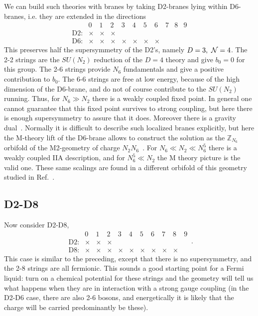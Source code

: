 \documentclass[12pt]{article}
\begin{document}
{We can build such theories with branes by taking D2-branes lying within D6-branes, i.e. they are extended in the directions
\begin{equation}
\begin{array}{ccccccccccc}
&0&1&2&3&4&5&6&7&8&9 \\
\mbox{D2:}&\times&\times&\times&&&&&&& \\
\mbox{D6:}&\times&\times&\times&\times&\times&\times&\times&&&
\end{array} 
\end{equation}
This preserves half the supersymmetry of the D2's, namely $D=3,\ {\cal N} = 4$.  The 2-2 strings are the $SU(N_2)$ reduction of the $D=4$ theory and give $b_0 = 0$ for this group.  The 2-6 strings provide $N_6$ fundamentals and give a positive contribution to $b_0$.  The 6-6 strings are free at low energy, because of the high dimension of the D6-brane, and do not of course contribute to the $SU(N_2)$ running.  Thus, for $N_6 \gg N_2$ there is a weakly coupled fixed point.  In general one cannot guarantee that this fixed point survives to strong coupling, but here there is enough supersymmetry to assure that it does.  Moreover there is a gravity dual~\cite{Pelc:1999ms}.  Normally it is difficult to describe such localized branes explicitly, but here the M-theory lift of the D6-brane allows to construct the solution as the ${\mathbb Z}_{N_6}$ orbifold of the M2-geometry of charge $N_2 N_6$~\cite{Itzhaki:1998uz}.  For $N_6 \ll N_2 \ll N_6^5$ there is a weakly coupled IIA description, and for $N_6^5 \ll N_2$ the M theory picture is the valid one.  These same scalings are found in a different orbifold of this geometry studied in Ref.~\cite{Aharony:2008ug}.

\subsection{D2-D8}

Now consider D2-D8,
\begin{equation}
\begin{array}{ccccccccccc}
&0&1&2&3&4&5&6&7&8&9 \\
\mbox{D2:}&\times&\times&\times&&&&&&& \\
\mbox{D8:}&\times&\times&\times&\times&\times&\times&\times&\times&\times&
\end{array} \,.
\end{equation}
This case is similar to the preceding, except that there is no supersymmetry, and the 2-8 strings are all fermionic.  This sounds a good starting point for a Fermi liquid: turn on a chemical potential for these strings and the geometry will tell us what happens when they are in interaction with a strong gauge coupling (in the D2-D6 case, there are also 2-6 bosons, and energetically it is likely that the charge will be carried predominantly be these).

}
\end{document}
